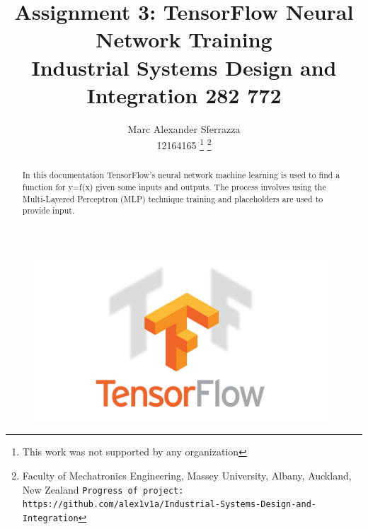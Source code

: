 \documentclass[a4paper, 10pt]{IEEEconf}
\title{\LARGE \bf Assignment 3: TensorFlow Neural Network Training\\Industrial Systems Design and Integration 282 772}
\author{Marc Alexander Sferrazza \\ 12164165
\thanks{This work was not supported by any organization}
\thanks{Faculty of Mechatronics Engineering, Massey University, Albany, Auckland, New Zealand
        {\tt\small Progress of project: https://github.com/alex1v1a/Industrial-Systems-Design-and-Integration} } }
\begin{document}
\maketitle
\begin{figure}[H]
  \begin{center}
  \includegraphics[width=110mm]{images/tf}
  \label{fig:kinetic}
  \end{center}
\end{figure}
\thispagestyle{empty}
\pagestyle{plain}



\begin{abstract}
In this documentation TensorFlow's neural network machine learning is used to find a function for y=f(x) given some inputs and outputs. The process involves using the Multi-Layered Perceptron (MLP) technique training and placeholders are used to provide input.
\end{abstract}


\clearpage
\thispagestyle{empty}
\tableofcontents
\begingroup
\let\clearpage\relax
\listoffigures
\endgroup
\clearpage
\twocolumn

\clearpage
\setcounter{page}{1}
\onecolumn
\end{document}
